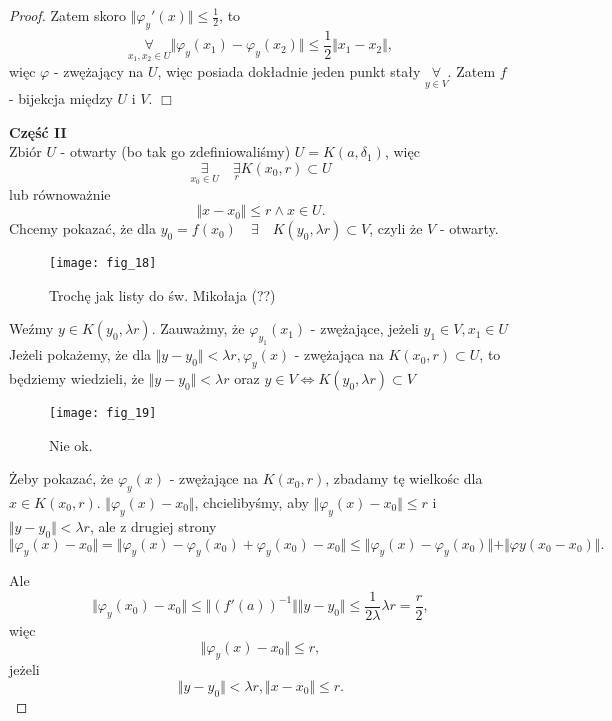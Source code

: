 \documentclass[../main.tex]{subfiles}
\begin{document}
\begin{proof}
Zatem skoro $\Vert \varphi_y '(x) \Vert \leq \frac{1}{2}$, to
$$\underset{x_1,x_2\in U}{\forall}\Vert \varphi_y(x_1) - \varphi_y (x_2) \Vert \leq \frac{1}{2} \Vert x_1 - x_2 \Vert,$$
więc $\varphi$ - zwężający na $U$, więc posiada dokładnie jeden punkt stały $\underset{y\in V}{\forall}$. Zatem $f$ - bijekcja między $U$ i $V$. $\Box$

    \vspace{0.5cm}
\textbf{Część II}\\
Zbiór $U$ - otwarty (bo tak go zdefiniowaliśmy) $U = K(a,\delta_1)$, więc
    \[
        \underset{x_0\in U}{\exists}\quad \underset{r}{\exists}K(x_0,r)\subset U
    \]
    lub równoważnie
    \[
        \Vert x-x_0 \Vert \leq r \land x\in U
    .\]
Chcemy pokazać, że dla $y_0 = f(x_0) \quad\exists\quad K(y_0,\lambda r)\subset V$, czyli że $V$ - otwarty.\\
\begin{figure}[h]
    \centering
    \texttt{[image: fig\_18]}
    \caption{Trochę jak listy do św. Mikołaja (??)}
    \label{fig:fig_18}
\end{figure}
Weźmy $y\in K(y_0,\lambda r)$. Zauważmy, że $\varphi_{y_1}(x_1)$ - zwężające, jeżeli $y_1\in V, x_1\in U$\\
Jeżeli pokażemy, że dla $\Vert y-y_0\Vert < \lambda r, \varphi_y(x)$ - zwężająca na $K(x_0,r)\subset U$, to będziemy wiedzieli, że $\Vert y - y_0 \Vert < \lambda r$ oraz $y\in V \iff K(y_0,\lambda r)\subset V$

\begin{figure}[h]
    \centering
    \texttt{[image: fig\_19]}
    \caption{Nie ok.}
    \label{fig:fig_19}
\end{figure}

Żeby pokazać, że $\varphi_y(x)$ - zwężające na $K(x_0,r)$, zbadamy tę wielkośc dla $x\in K(x_0,r)$.
$\Vert \varphi_y(x) - x_0 \Vert$, chcielibyśmy, aby $\Vert \varphi_y(x) - x_0 \Vert \leq r $ i $\Vert y - y_0 \Vert < \lambda r$, ale z drugiej strony
\[
    \Vert \varphi_y(x) - x_0 \Vert = \Vert \varphi_y(x) - \varphi_y(x_0) + \varphi_y(x_0) - x_0 \Vert \leq \Vert \varphi_y(x) - \varphi_y(x_0) \Vert + \Vert \varphi y(x_0 - x_0) \Vert.
\]

Ale
\[
    \Vert \varphi_y(x_0) - x_0 \Vert \leq \Vert (f'(a))^{-1} \Vert \Vert y - y_0 \Vert \leq \frac{1}{2\lambda} \lambda r = \frac{r}{2},
\]
więc
\[
    \Vert \varphi_y(x) - x_0 \Vert \leq r,
\]
jeżeli
\[
    \Vert y - y_0 \Vert < \lambda r, \Vert x - x_0 \Vert \leq r
.\]


\end{proof}
\end{document}
